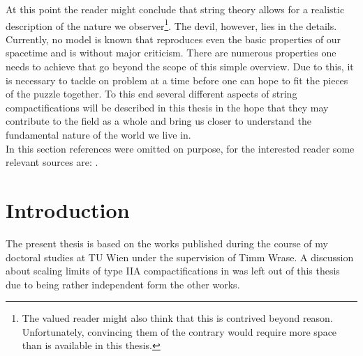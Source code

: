 \documentclass[12pt]{report}
\begin{document}
At this point the reader might conclude that string theory allows for a realistic description of the nature we observer\footnote{The valued reader might also think that this is contrived beyond reason. Unfortunately, convincing them of the contrary would require more space than is available in this thesis.}. The devil, however, lies in the details. Currently, no model is known that reproduces even the basic properties of our spacetime and is without major criticism. There are numerous properties one needs to achieve that go beyond the scope of this simple overview. Due to this, it is necessary to tackle on problem at a time before one can hope to fit the pieces of the puzzle together. To this end several different aspects of string compactifications will be described in this thesis in the hope that they may contribute to the field as a whole and bring us closer to understand the fundamental nature of the world we live in.\\

In this section references were omitted on purpose, for the interested reader some relevant sources are: \cite{above}.

\chapter{Introduction}


The present thesis is based on the works \cite{Roupec:2018mbn,Andriot:2018mav,Cribiori:2019hod,Cribiori:2019bfx,Cribiori:2019drf,Cribiori:2019hrb,Cribiori:2020bgt} published during the course of my doctoral studies at TU Wien under the supervision of Timm Wrase. A discussion about scaling limits of type IIA compactifications in \cite{Banlaki:2018ayh} was left out of this thesis due to being rather independent form the other works.

\end{document}
